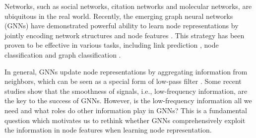 \documentclass[letterpaper]{article} %
\begin{document}
Networks, such as social networks, citation networks and molecular networks, are ubiquitous in the real world.
Recently, the emerging graph neural networks (GNNs) have demonstrated powerful ability to learn node representations by jointly encoding network structures and node features \cite{survey2, survey1, HINSurvey}.  This strategy has been proven to be effective in various tasks, including link prediction \cite{linkprediction}, node classification \cite{GCN, GAT} and graph classification \cite{graphclassification}.


In general, GNNs update node representations by aggregating information from neighbors, which can be seen as a special form of low-pass filter \cite{SGC, label2019li}. Some recent studies \cite{revisiting, GraphHeat} show that the smoothness of signals, i.e., low-frequency information, are the key to the success of GNNs.
However, is the low-frequency information all we need and what roles do other information play in GNNs? This is a fundamental question which motivates us to rethink whether GNNs comprehensively exploit the information in node features when learning node representation.
\end{document}
